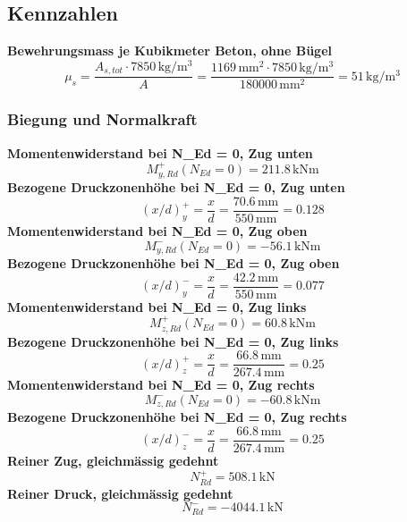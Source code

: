 \documentclass[11pt,a4paper]{article}
\begin{document}
\subsection{Kennzahlen}
\noindent\textbf{Bewehrungsmass je Kubikmeter Beton, ohne Bügel}
\begin{equation*}
\mu_s = \frac{A_{s,tot} \cdot 7850\,\mathrm{kg}/\mathrm{m}^{3}}{A} = \frac{1169\,\mathrm{mm}^{2} \cdot 7850\,\mathrm{kg}/\mathrm{m}^{3}}{180000\,\mathrm{mm}^{2}} = 51\,\mathrm{kg}/\mathrm{m}^{3}
\end{equation*}
\subsubsection{Biegung und Normalkraft}
\noindent\textbf{Momentenwiderstand bei N\_Ed = 0, Zug unten}
\begin{equation*}
M_{y,Rd}^{+}(N_{Ed} = 0) = 211.8\,\mathrm{kNm}
\end{equation*}
\noindent\textbf{Bezogene Druckzonenhöhe bei N\_Ed = 0, Zug unten}
\begin{equation*}
\left(x/d\right)_{y}^{+} = \frac{x}{d} = \frac{70.6\,\mathrm{mm}}{550\,\mathrm{mm}} = 0.128
\end{equation*}
\noindent\textbf{Momentenwiderstand bei N\_Ed = 0, Zug oben}
\begin{equation*}
M_{y,Rd}^{-}(N_{Ed} = 0) = -56.1\,\mathrm{kNm}
\end{equation*}
\noindent\textbf{Bezogene Druckzonenhöhe bei N\_Ed = 0, Zug oben}
\begin{equation*}
\left(x/d\right)_{y}^{-} = \frac{x}{d} = \frac{42.2\,\mathrm{mm}}{550\,\mathrm{mm}} = 0.077
\end{equation*}
\noindent\textbf{Momentenwiderstand bei N\_Ed = 0, Zug links}
\begin{equation*}
M_{z,Rd}^{+}(N_{Ed} = 0) = 60.8\,\mathrm{kNm}
\end{equation*}
\noindent\textbf{Bezogene Druckzonenhöhe bei N\_Ed = 0, Zug links}
\begin{equation*}
\left(x/d\right)_{z}^{+} = \frac{x}{d} = \frac{66.8\,\mathrm{mm}}{267.4\,\mathrm{mm}} = 0.25
\end{equation*}
\noindent\textbf{Momentenwiderstand bei N\_Ed = 0, Zug rechts}
\begin{equation*}
M_{z,Rd}^{-}(N_{Ed} = 0) = -60.8\,\mathrm{kNm}
\end{equation*}
\noindent\textbf{Bezogene Druckzonenhöhe bei N\_Ed = 0, Zug rechts}
\begin{equation*}
\left(x/d\right)_{z}^{-} = \frac{x}{d} = \frac{66.8\,\mathrm{mm}}{267.4\,\mathrm{mm}} = 0.25
\end{equation*}
\noindent\textbf{Reiner Zug, gleichmässig gedehnt}
\begin{equation*}
N_{Rd}^{+} = 508.1\,\mathrm{kN}
\end{equation*}
\noindent\textbf{Reiner Druck, gleichmässig gedehnt}
\begin{equation*}
N_{Rd}^{-} = -4044.1\,\mathrm{kN}
\end{equation*}
\end{document}
